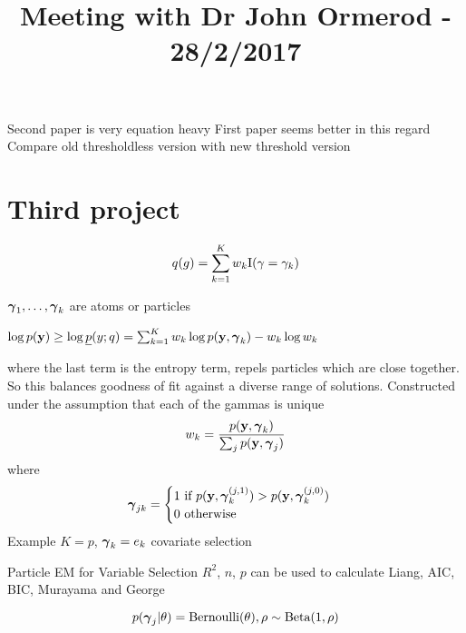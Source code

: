 \documentclass{amsart}
\title{Meeting with Dr John Ormerod - 28/2/2017}
\begin{document}
\maketitle

Second paper is very equation heavy
First paper seems better in this regard
Compare old thresholdless version with new threshold version

\section{Third project}
\[
	q(g) = \sum_{k=1}^K w_k \text{I}(\gamma = \gamma_k)
\]

${\boldsymbol \gamma}_1, \ldots, {\boldsymbol \gamma}_k$ are atoms or particles

$\log p({\bf y}) \geq \log \underline{p}(y; q) = \sum_{k=1}^K w_k \log p({\bf y}, {\boldsymbol \gamma}_k) - w_k \log w_k$

where the last term is the entropy term, repels particles which are close together. So this balances goodness
of fit against a diverse range of solutions.
Constructed under the assumption that each of the gammas is unique
\[
	w_k = \frac{p({\bf y}, {\boldsymbol \gamma}_k)}{\sum_j p({\bf y}, {\boldsymbol \gamma}_j)}
\]
where
\[
	{\boldsymbol \gamma}_{jk} = \begin{cases}
		1 \text{ if } p({\bf y}, {\boldsymbol \gamma}_k^{(j, 1)}) > p({\bf y}, {\boldsymbol \gamma}_k^{(j, 0)}) \\
		0 \text{ otherwise}
	\end{cases}
\]
Example $K = p$, ${\boldsymbol \gamma}_k = e_k$ covariate selection

Particle EM for Variable Selection
$R^2$, $n$, $p$ can be used to calculate Liang, AIC, BIC, Murayama and George

\[
	p({\boldsymbol \gamma}_j | \theta) = \text{Bernoulli}(\theta), \rho \sim \text{Beta}(1, \rho)
\]
\end{document}
